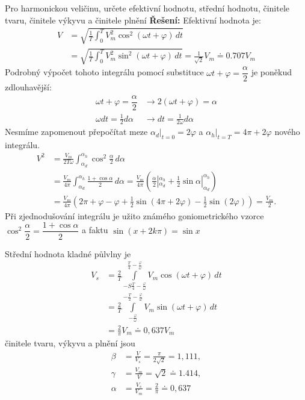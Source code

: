 \begin{example}\label{TEO:exam007}
  Pro harmonickou veličinu, určete efektivní hodnotu, střední hodnotu, činitele tvaru, činitele
  výkyvu a činitele plnění \newline
  \textbf{Řešení:} Efektivní hodnota je:
  \begin{align}
    V &= \sqrt{\frac{1}{T}\int_0^TV_m^2\cos^2{(\omega t + \varphi)}\,dt}    \nonumber  \\
      &= \sqrt{\frac{1}{T}\int_0^TV_m^2\sin^2{(\omega t + \varphi)}\,dt} = 
         \frac{1}{\sqrt{2}}V_m \doteq 0.707 V_m   
  \end{align}
  Podrobný výpočet tohoto integrálu pomocí substituce $\omega t + \varphi=\dfrac{\alpha}{2}$ je
  poněkud zdlouhavější:
  \begin{align*}
      \omega t + \varphi=\dfrac{\alpha}{2}   
    & \rightarrow  2(\omega t + \varphi) = \alpha      \\ 
      \omega dt = \frac{1}{2}d\alpha         
    & \rightarrow dt = \frac{1}{2\omega}d\alpha
  \end{align*}
  Nesmíme zapomenout přepočítat meze $\alpha_d|_{t=0}=2\varphi$ a $\alpha_h|_{t=T} = 
  4\pi+2\varphi$ nového integrálu.
  \begin{align*}
    V^2  &= \frac{V_m}{2T\omega}\int_{\alpha_d}^{\alpha_h}\cos^2\frac{\alpha}{2}\,d\alpha    \\
         &= \frac{V_m}{4\pi}\int_{\alpha_d}^{\alpha_h}\frac{1+\cos\alpha}{2}\,d\alpha  
          = \frac{V_m}{4\pi}\left(\frac{\alpha}{2}|_{\alpha_d}^{\alpha_h}
          + \frac{1}{2}\sin\alpha|_{\alpha_d}^{\alpha_h}\right)                              \\
         &= \frac{V_m}{4\pi}\left(2\pi+\varphi-\varphi 
          + \frac{1}{2}\sin(4\pi+2\varphi)
          - \frac{1}{2}\sin(2\varphi)\right) = \frac{V_m}{2}.  
  \end{align*}  
  Při zjednodušování integrálu je užito známého goniometrického vzorce \(\cos^2\dfrac{\alpha}{2} = 
  \dfrac{1+\cos\alpha}{2}\) a faktu \(\sin(x+2k\pi)=\sin x\)
  
  Střední hodnota kladné půlvlny je 
  \begin{align*}
    V_s &= \frac{2}{T}\int\limits_{-S\frac{T}{4}-
           \frac{\varphi}{\omega}}^{\frac{T}{4}-
           \frac{\varphi}{\omega}}{V_m\cos(\omega t +\varphi)}\,dt                            \\
        &= \frac{2}{T}\int\limits_{-\frac{\varphi}{\omega}}^{-\frac{T}{2}-
           \frac{\varphi}{\omega}}{V_m\sin(\omega t +\varphi)}\,dt                            \\
        &= \frac{2}{\pi}V_m \doteq 0,637V_m
  \end{align*}
  činitele tvaru, výkyvu a plnění jsou 
  \begin{align*}
    \beta  &=\frac{V}{V_s}   =\frac{\pi}{2\sqrt{2}}=1,111, \\ 
    \gamma &=\frac{V_m}{V}   =\sqrt{2}\doteq1.414,         \\
    \alpha &=\frac{V_s}{V_m} =\frac{2}{\pi}\doteq0,637 
  \end{align*}
\end{example}